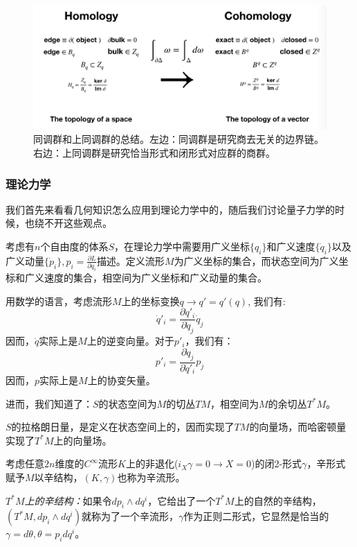 \documentclass[supercite]{HustGraduPaper}
\begin{document}
	\begin{figure}
		\centering
		\includegraphics[width=1\linewidth]{Figures/screenshot003}
		\caption{同调群和上同调群的总结。左边：同调群是研究商去无关的边界链。右边：上同调群是研究恰当形式和闭形式对应群的商群。}
		\label{fig:screenshot003_2}
	\end{figure}
    \subsubsection{理论力学}
    我们首先来看看几何知识怎么应用到理论力学中的，随后我们讨论量子力学的时候，也绕不开这些观点。
    
    考虑有$n$个自由度的体系$S$，在理论力学中需要用广义坐标$\{q_i\}$和广义速度$\{\dot{q}_i\}$以及广义动量$\{\dot{p}_i\},p_i = \frac{\partial L}{\partial \dot{q}_i}$描述。定义流形$M$为广义坐标的集合，而状态空间为广义坐标和广义速度的集合，相空间为广义坐标和广义动量的集合。
    
    用数学的语言，考虑流形$M$上的坐标变换$q \to q' = q'(q)$, 我们有:
    \begin{equation}
    \dot{q}'_i= \frac{\partial \dot{q}'_i}{\partial \dot{q}_j} \dot{q}_j
    \end{equation}
    因而，$\dot{q}$实际上是$M$上的逆变向量。对于$p'_i$，我们有：
    \begin{equation}
    p'_i= \frac{\partial \dot{q}_j}{\partial \dot{q}'_i} p_j
    \end{equation}
    因而，$p$实际上是$M$上的协变矢量。
    
    进而，我们知道了：$S$的状态空间为$M$的切丛$TM$，相空间为$M$的余切丛$T^*M$。
    
    $S$的拉格朗日量，是定义在状态空间上的，因而实现了$TM$的向量场，而哈密顿量实现了$T^*M$上的向量场。
    
    考虑任意$2n$维度的$C^\infty$流形$K$上的非退化($i_X \gamma = 0 \to X = 0$)的闭2-形式$\gamma$，辛形式赋予$M$以辛结构，$(K,\gamma)$也称为辛流形。
    
  \textit{$T^*M$上的辛结构：}如果令$dp_i\wedge dq^i$，它给出了一个$T^*M$上的自然的辛结构，  $(T^*M, dp_i\wedge dq^i)$就称为了一个辛流形，$\gamma$作为正则二形式，它显然是恰当的$\gamma = d\theta, \theta = p_i dq^i$。
  
\end{document}
